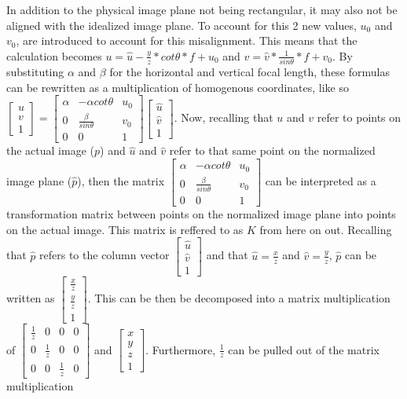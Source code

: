 In addition to the physical image plane not being rectangular, it may also not be aligned with the idealized image plane.  To
account for this 2 new values, $u_0$ and $v_0$, are introduced to account for this misalignment.  This means that the
calculation becomes $u=\hat{u}-\frac{y}{z} * cot \theta * f + u_0$ and $v=\hat{v} * \frac{1}{sin \theta} * f + 
v_0$. By substituting $\alpha$ and $\beta$ for the horizontal and vertical focal length, these formulas can be rewritten as a 
multiplication of homogenous coordinates, like so $\begin{bmatrix} u \\ v \\ 1 \end{bmatrix} = \begin{bmatrix} \alpha & -\alpha 
cot\theta & u_{0} \\ 0 & \frac{\beta}{sin\theta} & v_{0} \\ 0 & 0 & 1 \end{bmatrix} \begin{bmatrix}\hat{u} \\ \hat{v}\\ 
1\end{bmatrix}$.  
Now, recalling that $u$ and $v$ refer to points on the actual image ($p$) and $\hat{u}$ and $\hat{v}$ refer to that same point 
on the normalized image plane ($\hat{p}$), then the matrix $\begin{bmatrix} \alpha & -\alpha cot\theta & u_0 \\ 0 & \frac{\beta}
{sin\theta} & v_0 \\ 0 & 0 & 1 \end{bmatrix}$ can be interpreted as a transformation matrix between points on the normalized image 
plane into points on the actual image.  This matrix is reffered to as $K$ from here on out.  Recalling that $\hat{p}$ refers to 
the column vector $\begin{bmatrix} \hat{u} \\ \hat{v} \\ 1 \end{bmatrix}$ and that $\hat{u} = \frac{x}{z}$ and $\hat{v} = \frac{y}
{z}$, $\hat{p}$ can be written as $\begin{bmatrix} \frac{x}{z} \\ \frac{y}{z} \\ 1 \end{bmatrix}$.  This can be then be decomposed into 
a matrix multiplication of $\begin{bmatrix} \frac{1}{z} & 0 & 0 & 0 \\ 0 & \frac{1}{z} & 0 & 0 \\ 0 & 0 & \frac{1}{z} & 0 
\end{bmatrix}$ and $\begin{bmatrix} x \\ y \\ z \\ 1 \end{bmatrix}$.  Furthermore, $\frac{1}{z}$ can be pulled out of the matrix multiplication 
